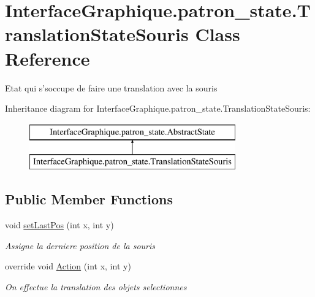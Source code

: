 \hypertarget{class_interface_graphique_1_1patron__state_1_1_translation_state_souris}{\section{Interface\-Graphique.\-patron\-\_\-state.\-Translation\-State\-Souris Class Reference}
\label{class_interface_graphique_1_1patron__state_1_1_translation_state_souris}
}


Etat qui s'soccupe de faire une translation avec la souris  


Inheritance diagram for Interface\-Graphique.\-patron\-\_\-state.\-Translation\-State\-Souris\-:\begin{figure}[H]
\begin{center}
\leavevmode
\includegraphics[height=2.000000cm]{class_interface_graphique_1_1patron__state_1_1_translation_state_souris}
\end{center}
\end{figure}
\subsection*{Public Member Functions}
\begin{DoxyCompactItemize}
\item 
void \hyperlink{class_interface_graphique_1_1patron__state_1_1_translation_state_souris_a509c0b06ffeacd1fee1cace423f55023}{set\-Last\-Pos} (int x, int y)
\begin{DoxyCompactList}\small\item\em Assigne la derniere position de la souris \end{DoxyCompactList}\item 
override void \hyperlink{class_interface_graphique_1_1patron__state_1_1_translation_state_souris_a2370ab1d0a55afefdd46eda17dc13ce6}{Action} (int x, int y)
\begin{DoxyCompactList}\small\item\em On effectue la translation des objets selectionnes \end{DoxyCompactList}\end{DoxyCompactItemize}


